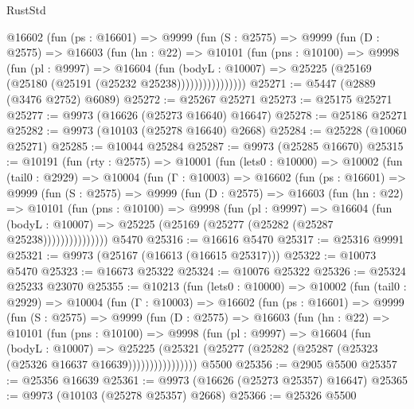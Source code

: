 \begin{lexlean}{RustStd}
\begin{coremodule}
            @16602
              (fun (ps : @16601) =>
              @9999
                (fun (S : @2575) =>
                @9999
                  (fun (D : @2575) =>
                  @16603
                    (fun (hn : @22) =>
                    @10101
                      (fun (pns : @10100) =>
                      @9998
                        (fun (pl : @9997) =>
                        @16604
                          (fun (bodyL : @10007) =>
                          @25225 (@25169 (@25180 (@25191 (@25232 @25238))))))))))))))))
@25271 := @5447 (@2889 (@3476 @2752) @6089)
@25272 := @25267 @25271
@25273 := @25175 @25271
@25277 := @9973 (@16626 (@25273 @16640) @16647)
@25278 := @25186 @25271
@25282 := @9973 (@10103 (@25278 @16640) @2668)
@25284 := @25228 (@10060 @25271)
@25285 := @10044 @25284
@25287 := @9973 (@25285 @16670)
@25315 := @10191
    (fun (rty : @2575) =>
    @10001
      (fun (lets0 : @10000) =>
      @10002
        (fun (tail0 : @2929) =>
        @10004
          (fun (Γ : @10003) =>
          @16602
            (fun (ps : @16601) =>
            @9999
              (fun (S : @2575) =>
              @9999
                (fun (D : @2575) =>
                @16603
                  (fun (hn : @22) =>
                  @10101
                    (fun (pns : @10100) =>
                    @9998
                      (fun (pl : @9997) =>
                      @16604
                        (fun (bodyL : @10007) =>
                        @25225 (@25169 (@25277 (@25282 (@25287 @25238)))))))))))))))
    @5470
@25316 := @16616 @5470
@25317 := @25316 @9991
@25321 := @9973 (@25167 (@16613 (@16615 @25317)))
@25322 := @10073 @5470
@25323 := @16673 @25322
@25324 := @10076 @25322
@25326 := @25324 @25233 @23070
@25355 := @10213
    (fun (lets0 : @10000) =>
    @10002
      (fun (tail0 : @2929) =>
      @10004
        (fun (Γ : @10003) =>
        @16602
          (fun (ps : @16601) =>
          @9999
            (fun (S : @2575) =>
            @9999
              (fun (D : @2575) =>
              @16603
                (fun (hn : @22) =>
                @10101
                  (fun (pns : @10100) =>
                  @9998
                    (fun (pl : @9997) =>
                    @16604
                      (fun (bodyL : @10007) =>
                      @25225
                        (@25321
                          (@25277 (@25282 (@25287 (@25323 (@25326 @16637 @16639))))))))))))))))
    @5500
@25356 := @2905 @5500
@25357 := @25356 @16639
@25361 := @9973 (@16626 (@25273 @25357) @16647)
@25365 := @9973 (@10103 (@25278 @25357) @2668)
@25366 := @25326 @5500

\end{coremodule}
\end{lexlean}
